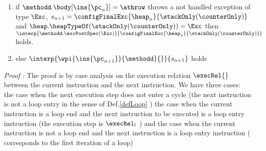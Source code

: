 \begin{lemma}
\begin{enumerate}
	 \item if $\methodd.\body[\ins{\pc_n}] = \athrow $ throws a not handled exception of type $\Exc$,
	 	 $ s_{n+1} =\configFinalExc{ \heap_{n}}{  \stackOnly (\counterOnly)} $ and $\heap.\heapTypeOf(\stackOnly (\counterOnly) ) = \Exc  $ 
	 then  $\interp{\methodd.\excPostSpec( \Exc)}{\configFinalExc{ \heap_{n}}{  \stackOnly (\counterOnly)   } } $  holds.


%	
	
	
	\item else   $\interp{ \wpi{\ins{\pc_{n+1}}}{\methodd}{  } } { s_{n+1} } $  holds
\end{enumerate}
\end{lemma}

\textit{Proof :}
The proof is by case analysis on the execution relation $\execRel{}$  between the current instruction and the next instruction.
 We have three cases: the case when the next execution step does not enter a cycle (the next instruction is not a loop entry in the sense of Def.\ref{defLoop} )
the case when the current instruction is a loop end and the next instruction to be executed is a loop entry instruction (the execution step is $\execRel_l$ )
and the case when the current instruction is not a loop end and the next instruction is a loop entry instruction ( corresponds to the first iteration of a loop) 


